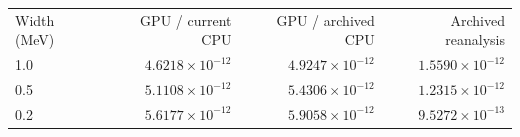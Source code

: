 \begin{tabular}{lrrr}
\toprule
Width (MeV) & GPU / current CPU & GPU / archived CPU & Archived reanalysis \\
1.0 & $4.6218\times10^{-12}$ & $4.9247\times10^{-12}$ & $1.5590\times10^{-12}$ \\
0.5 & $5.1108\times10^{-12}$ & $5.4306\times10^{-12}$ & $1.2315\times10^{-12}$ \\
0.2 & $5.6177\times10^{-12}$ & $5.9058\times10^{-12}$ & $9.5272\times10^{-13}$ \\
\bottomrule
\end{tabular}
